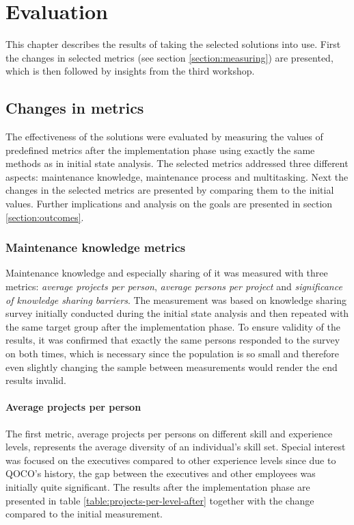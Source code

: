 \chapter{Evaluation}
\label{chapter:evaluation}

This chapter describes the results of taking the selected solutions into use. First the changes in selected metrics (see section \ref{section:measuring})
are presented, which is then followed by insights from the third workshop.

\section{Changes in metrics}
\label{section:metric-results}

The effectiveness of the solutions were evaluated by measuring the values of predefined metrics after the implementation phase using
exactly the same methods as in initial state analysis. The selected metrics addressed three different aspects: maintenance knowledge, maintenance process and multitasking.
Next the changes in the selected metrics are presented by comparing them to the initial values. Further implications and analysis on the goals are presented in section \ref{section:outcomes}.

\subsection{Maintenance knowledge metrics}
\label{section:knowledge-metrics-after}

Maintenance knowledge and especially sharing of it was measured with three metrics: \emph{average projects per person}, \emph{average persons per project} and \emph{significance of knowledge sharing barriers}.
The measurement was based on knowledge sharing survey initially conducted during the initial state analysis and then repeated with the same target group after the implementation phase.
To ensure validity of the results, it was confirmed that exactly the same persons responded to the survey on both times, which is necessary since the population is so small and therefore even slightly changing
the sample between measurements would render the end results invalid.

\subsubsection*{Average projects per person}

The first metric, average projects per persons on different skill and experience levels, represents the average diversity of an individual's skill set. Special interest was focused on the executives compared to
other experience levels since due to QOCO's history, the gap between the executives and other employees was initially quite significant. The results after the implementation phase are presented in
table \ref{table:projects-per-level-after} together with the change compared to the initial measurement.

